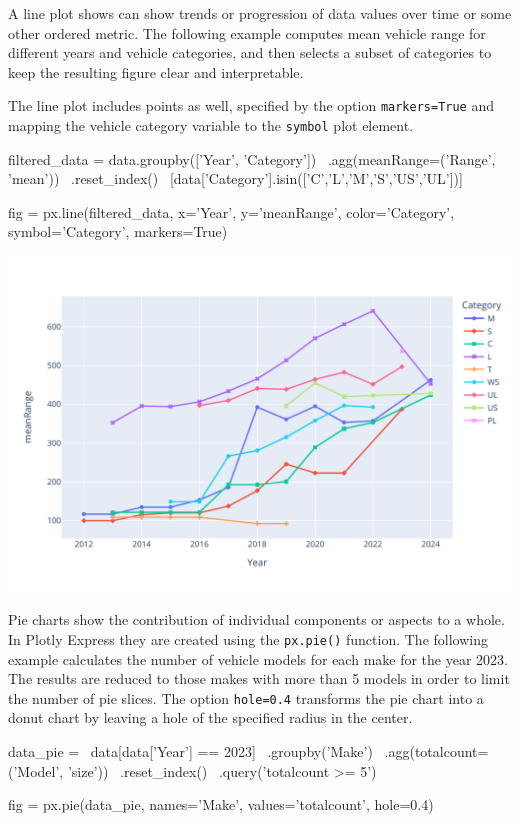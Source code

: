 A line plot shows can show trends or progression of data values over time or some other ordered metric. The following example computes mean vehicle range for different years and vehicle categories, and then selects a subset of categories to keep the resulting figure clear and interpretable. 

The line plot includes points as well, specified by the option \texttt{markers=True} and mapping the vehicle category variable to the \texttt{symbol} plot element. 

\begin{pythoncode}
filtered_data = 
    data.groupby(['Year', 'Category']) \
       .agg(meanRange=('Range', 'mean')) \
       .reset_index() \
       [data['Category'].isin(['C','L','M','S','US','UL'])] 
       
fig = px.line(filtered_data, 
    x='Year', y='meanRange', color='Category', 
    symbol='Category', markers=True)
\end{pythoncode}

\begin{center}
  \includegraphics[width=.8\textwidth]{px.fuel.linesPoints.pdf}
\end{center}

Pie charts\index{Plot!Pie chart} show the contribution of individual components or aspects to a whole. In Plotly Express they are created using the \texttt{px.pie()} function. The following example calculates the number of vehicle models for each make for the year 2023. The results are reduced to those makes with more than 5 models in order to limit the number of pie slices. The option \texttt{hole=0.4} transforms the pie chart into a donut chart by leaving a hole of the specified radius in the center.

\begin{pythoncode}
data_pie = \
  data[data['Year'] == 2023] \
    .groupby('Make') \
    .agg(totalcount=('Model', 'size')) \
    .reset_index() \
    .query('totalcount >= 5')

fig = px.pie(data_pie, 
             names='Make', values='totalcount', 
             hole=0.4)
\end{pythoncode}

